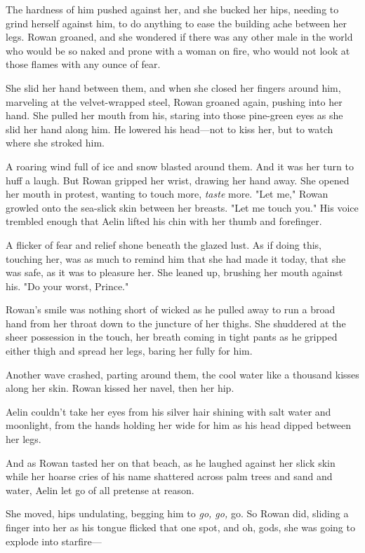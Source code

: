 The hardness of him pushed against her, and she bucked her hips, needing to grind herself against him, to do anything to ease the building ache between her legs.
Rowan groaned, and she wondered if there was any other male in the world who would be so naked and prone with a woman on fire, who would not look at those flames with any ounce of fear.

She slid her hand between them, and when she closed her fingers around him, marveling at the velvet-wrapped steel, Rowan groaned again, pushing into her hand.
She pulled her mouth from his, staring into those pine-green eyes as she slid her hand along him.
He lowered his head---not to kiss her, but to watch where she stroked him.

A roaring wind full of ice and snow blasted around them.
And it was her turn to huff a laugh.
But Rowan gripped her wrist, drawing her hand away.
She opened her mouth in protest, wanting to touch more,
\emph{taste} more.
"Let me," Rowan growled onto the sea-slick skin between her breasts.
"Let me touch you."
His voice trembled enough that Aelin lifted his chin with her thumb and forefinger.

A flicker of fear and relief shone beneath the glazed lust.
As if doing this, touching her, was as much to remind him that she had made it today, that she was safe, as it was to pleasure her.
She leaned up, brushing her mouth against his.
"Do your worst, Prince."

Rowan's smile was nothing short of wicked as he pulled away to run a broad hand from her throat down to the juncture of her thighs.
She shuddered at the sheer possession in the touch, her breath coming in tight pants as he gripped either thigh and spread her legs, baring her fully for him.

Another wave crashed, parting around them, the cool water like a thousand kisses along her skin.
Rowan kissed her navel, then her hip.

Aelin couldn't take her eyes from his silver hair shining with salt water and moonlight, from the hands holding her wide for him as his head dipped between her legs.

And as Rowan tasted her on that beach, as he laughed against her slick skin while her hoarse cries of his name shattered across palm trees and sand and water, Aelin let go of all pretense at reason.

She moved, hips undulating, begging him to \emph{go, go,} go.
So Rowan did, sliding a finger into her as his tongue flicked that one spot, and oh, gods, she was going to explode into starfire---

